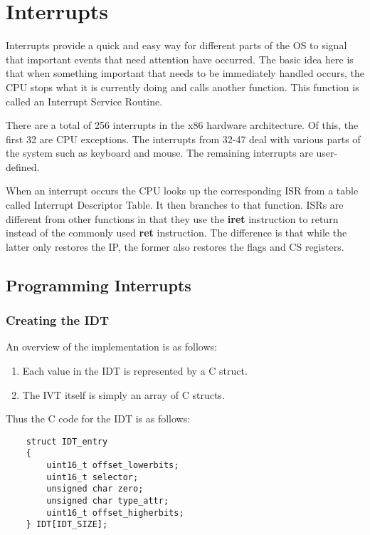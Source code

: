 \chapter{Interrupts}\label{chapter:Interrupts}
Interrupts provide a quick and easy way for different parts of the OS to signal that important events 
that need attention have occurred. The basic idea here is that when something important that needs to 
be immediately handled occurs, the CPU stops what it is currently doing and calls another function.
This function is called an Interrupt Service Routine.

\vspace{1cm}
There are a total of 256 interrupts in the x86 hardware architecture. Of this, the first 32 are CPU exceptions.
The interrupts from 32-47 deal with various parts of the system such as keyboard and mouse. 
The remaining interrupts are user-defined.

\vspace{1cm}
When an interrupt occurs the CPU looks up the corresponding ISR from a table called Interrupt Descriptor Table.
It then branches to that function. ISRs are different from other functions in that they use the \textbf{iret} instruction
to return instead of the commonly used \textbf{ret} instruction. The difference is that while the latter only restores the IP,
the former also restores the flags and CS registers.
\pagebreak

\section{Programming Interrupts}\label{section:Programming Interrupts}

\subsection{Creating the IDT}\label{subsection:Creating the IDT}
An overview of the implementation is as follows:
\begin{enumerate}
    \item Each value in the IDT is represented by a C struct.
    \item The IVT itself is simply an array of C structs.
\end{enumerate}

Thus the C code for the IDT is as follows:
\begin{lstlisting}
    struct IDT_entry
    {
        uint16_t offset_lowerbits;
        uint16_t selector;
        unsigned char zero;
        unsigned char type_attr;
        uint16_t offset_higherbits;
    } IDT[IDT_SIZE];
\end{lstlisting}

